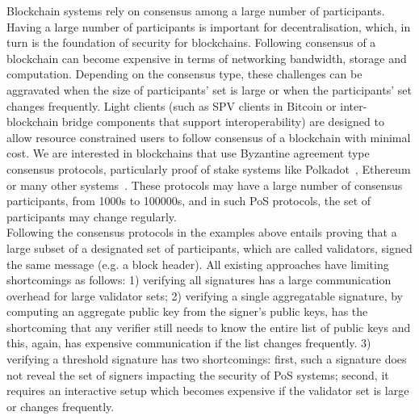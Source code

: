 \noindent Blockchain systems rely on consensus among a large number of participants. Having a large number of participants is important for 
decentralisation, which, in turn is the foundation of security for blockchains. Following consensus of a blockchain can become expensive in 
terms of networking bandwidth, storage and computation. Depending on the consensus type, these challenges can be aggravated when the 
size of participants' set is large or when the participants' set changes frequently. Light clients (such as SPV clients in Bitcoin or inter-blockchain 
bridge components that support interoperability) are designed to allow resource constrained users to follow consensus of a blockchain with 
minimal cost. We are interested in blockchains that use Byzantine agreement type consensus protocols, particularly proof of stake systems 
like Polkadot~\cite{polkadot}, Ethereum 
or many other systems~\cite{dfinity, mina, celo, tendermint_paper, cosmos}. These protocols 
may have a large number of consensus participants, from 1000s to 100000s, and in such PoS protocols, the set of participants may change regularly. \\

\noindent Following the consensus protocols in the examples above entails proving that a large subset of a designated set of participants, 
which are called validators, signed the same message (e.g. a block header). All existing approaches have limiting shortcomings as follows:
1) verifying all signatures has a large communication overhead for large validator sets;
2) verifying a single aggregatable signature, by computing an aggregate public key from the signer's public keys, has the shortcoming that any verifier still 
needs to know the entire list of public keys and this, again, has expensive communication if the list changes frequently. 
3) verifying a threshold signature has two shortcomings: first, such a signature does not reveal the set of signers impacting the 
security of PoS systems; second, it requires an interactive setup which becomes expensive if the validator set is large or changes frequently. 

